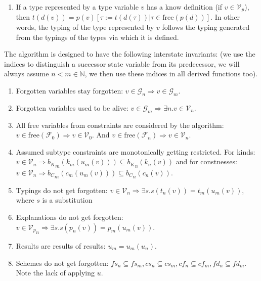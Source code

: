 \begin{defn}
\begin{enumerate}
        \item If a type represented by a type variable $v$ has a know definition (if $v \in \mathcal{V}_p$), then $t (d (v)) = p(v) \left[ \tau := t (d (\tau)) | \tau \in \mathrm{free} (p (d))\right]$. In other words, the typing of the type represented by $v$ follows the typing generated from the typings of the types via which it is defined. \label{invT}
    \end{enumerate}
\end{defn}

\begin{defn}
    The algorithm is designed to have the following interstate invariants: (we use the indices to distinguish a successor state variable from its predecessor, we will always assume $n < m \in \mathbb{N}$, we then use these indices in all derived functions too).

    \begin{enumerate}
        \item Forgotten variables stay forgotten: $v \in \mathcal{G}_n \Rightarrow v \in \mathcal{G}_m$.
        \item Forgotten variables used to be alive: $v \in \mathcal{G}_m \Rightarrow \exists n . v \in \mathcal{V}_n$.
        \item All free variables from constraints are considered by the algorithm: $v \in \mathrm{free} (\mathcal{F}_0) \Rightarrow v \in \mathcal{V}_0$. And $v \in \mathrm{free} (\mathcal{F}_n) \Rightarrow v \in \mathcal{V}_n$.
        \item Assumed subtype constraints are monotonically getting restricted. For kinds: $v \in {\mathcal{V}}_n \Rightarrow {b_K}_m (k_m(u_m(v))) \subseteq {b_K}_n (k_n(v))$ and for constnesses: $v \in {\mathcal{V}}_n \Rightarrow {b_C}_m (c_m(u_m(v))) \subseteq {b_C}_n (c_n(v))$.
        \item Typings do not get forgotten: $v \in {\mathcal{V}}_n \Rightarrow \exists s . s(t_n(v)) = t_m(u_m (v))$, where $s$ is a substitution
        \item Explanations do not get forgotten: $v \in {\mathcal{V}_p}_n \Rightarrow \exists s . s(p_n(v)) = p_m(u_m (v))$.
        \item Results are results of results: $u_m = u_m (u_n)$.
        \item Schemes do not get forgotten: $fs_n \subseteq fs_m, cs_n \subseteq cs_m, cf_n \subseteq  cf_m, fd_n \subseteq  fd_m$. Note the lack of applying $u$.
    \end{enumerate}
\end{defn}

